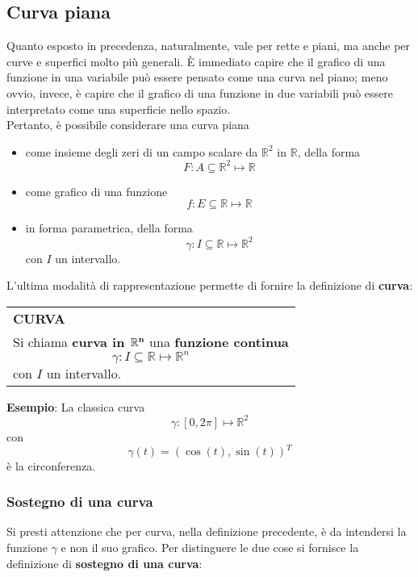 \documentclass[a4paper]{extarticle}
\renewcommand\arraystretch{}
\begin{document}
\vspace{1em}
\noindent
\subsection{Curva piana}
Quanto esposto in precedenza, naturalmente, vale per rette e piani, ma anche per curve e superfici molto più generali. È immediato capire che il grafico di una funzione in una variabile può essere pensato come una curva nel piano; meno ovvio, invece, è capire che il grafico di una funzione in due variabili può essere interpretato come una superficie nello spazio.\\
Pertanto, è possibile considerare una curva piana
\begin{itemize}
    \item come insieme degli zeri di un campo scalare da $\mathbb{R}^2$ in $\mathbb{R}$, della forma
    \[F : A \subseteq \mathbb{R}^2 \longmapsto \mathbb{R}\]
    \item come grafico di una funzione
    \[f : E \subseteq \mathbb{R} \longmapsto \mathbb{R}\]
    \item in forma parametrica, della forma
    \[\gamma : I \subseteq \mathbb{R} \longmapsto \mathbb{R}^2\]
    con $I$ un intervallo.
\end{itemize}
L'ultima modalità di rappresentazione permette di fornire la definizione di \textbf{curva}:

\vspace{1em}
\setlength{\tabcolsep}{14pt}
\renewcommand{\arraystretch}{2}
\noindent
\begin{tabularx}{\textwidth}{@{}|P|@{}}
    \hline
    {\textbf{CURVA}}\\
    \parbox{\linewidth}{Si chiama \textbf{curva in $\bf{\mathbb{R}^n}$} una \textbf{funzione continua}
    \[\gamma : I \subseteq \mathbb{R} \longmapsto \mathbb{R}^n\]
    con $I$ un intervallo. \vspace{3mm}}\\
    \hline
\end{tabularx}

\vspace{2em}
\noindent
\textbf{Esempio}: La classica curva
\[\gamma : [0,2\pi] \longmapsto \mathbb{R}^2\]
con
\[\gamma(t) = \left(\cos(t),\sin(t)\right){^T}\]
è la circonferenza.

\vspace{1em}
\noindent
\subsubsection{Sostegno di una curva}
Si presti attenzione che per curva, nella definizione precedente, è da intendersi la funzione $\gamma$ e non il suo grafico. Per distinguere le due cose si fornisce la definizione di \textbf{sostegno di una curva}:
\end{document}
